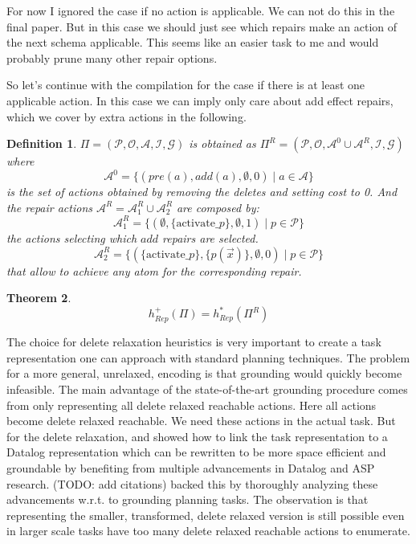 \documentclass[twocolumn]{article}
\newcommand{\task}{\ensuremath{\Pi}\xspace}
\newcommand{\preds}{\ensuremath{\mathcal{P}}\xspace}
\newcommand{\acts}{\ensuremath{\mathcal{A}}\xspace}
\newcommand{\objects}{\ensuremath{\mathcal{O}}\xspace}
\newcommand{\init}{\ensuremath{\mathcal{I}}\xspace}
\newcommand{\goal}{\ensuremath{\mathcal{G}}\xspace}
\newcommand{\someVar}{\ensuremath{x}\xspace}
\newcommand{\someAtom}{\ensuremath{p(\vec{\someVar})}\xspace}
\newcommand{\somePred}{\ensuremath{p}\xspace}
\newcommand{\prename}{\ensuremath{pre}\xspace}
\newcommand{\addname}{\ensuremath{add}\xspace}
\newcommand{\pre}[1]{\ensuremath{\prename(#1)}\xspace}
\newcommand{\add}[1]{\ensuremath{\addname(#1)}\xspace}
\newcommand{\someAct}{\ensuremath{a}\xspace}
\newcommand{\optimalHeuristic}{\ensuremath{h^{*}_{Rep}}\xspace}
\newcommand{\optimalHeuristicRel}{\ensuremath{h^{+}_{Rep}}\xspace}
\newtheorem{theorem}{Theorem}
\newtheorem{definition}[theorem]{Definition}
\begin{document}
	For now I ignored the case if no action is applicable. 
	We can not do this in the final paper.
	But in this case we should just see which repairs make an action of the next schema applicable. 
	This seems like an easier task to me and would probably prune many other repair options.
	
	So let's continue with the compilation for the case if there is at least one applicable action. 
	In this case we can imply only care about add effect repairs, which we cover by extra actions in the following.
	
	\begin{definition}
		
		$\task = (\preds, \objects, \acts, \init, \goal)$
		is obtained as
		$\task^{R} = (\preds, \objects, \acts^0 \cup \acts^{R}, \init, \goal)$
		where 
		$$
		\acts^0 = \{
		(\pre{\someAct}, \add{\someAct}, \emptyset, 0) \mid \someAct \in \acts
		\}
		$$
		is the set of actions obtained by removing the deletes and setting cost to 0.
		And the repair actions $\acts^{R} = \acts^{R}_1 \cup \acts^{R}_2$ are composed by:
		$$
		\acts^{R}_1 = 
		\{
		(\emptyset, \{\text{activate\_}\somePred\}, \emptyset, 1) \mid \somePred \in \preds
		\}
		$$
		the actions selecting which \addname repairs are selected.
		$$
		\acts^{R}_2
		= \{
		(\{\text{activate\_}\somePred\}, \{\someAtom\}, \emptyset, 0) \mid \somePred \in \preds
		\}$$
		that allow to achieve any atom for the corresponding repair.
	\end{definition}
	
	\begin{theorem}
		$$\optimalHeuristicRel(\task) = \optimalHeuristic(\task^{R})$$
	\end{theorem}
	
	\smallskip
	
	The choice for delete relaxation heuristics is very important to create a task representation one can approach with standard planning techniques.
	The problem for a more general, unrelaxed,  encoding is that grounding would quickly become infeasible.
	The main advantage of the state-of-the-art grounding procedure \citep{helmert:aij-09} comes from only representing all delete relaxed reachable actions. 
	Here all actions become delete relaxed reachable.
	We need these actions in the actual task.
	But for the delete relaxation, \cite{helmert:aij-09} and \cite{correa:etal:icaps-21} showed how to link the task representation to a Datalog representation which can be rewritten to be more space efficient and groundable by 
	benefiting from multiple advancements in Datalog and ASP research.
	(TODO: add citations)
	\cite{correa:etal:icaps-23} backed this by thoroughly analyzing these advancements w.r.t. to grounding planning tasks.
	The observation is that representing the smaller, transformed, delete relaxed version is still possible even in larger scale tasks have too many delete relaxed reachable actions to enumerate.
	
\end{document}
